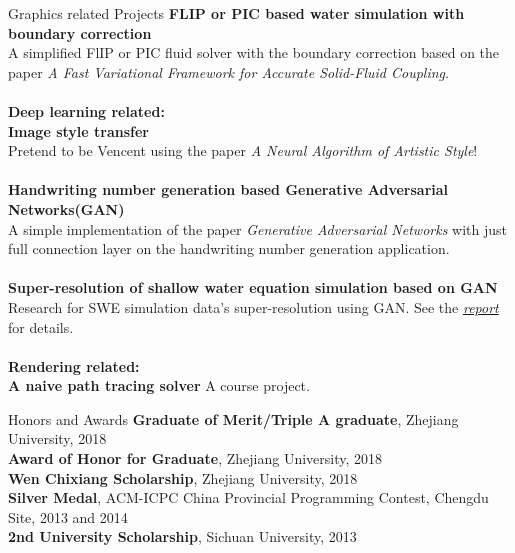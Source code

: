 \documentclass{resume} %
\makeatletter
\newcommand{\tabincell}[2]{\begin{tabular}{@{}#1@{}}#2\end{tabular}}
\makeatother
\begin{document}
\begin{rSection}{Graphics related Projects}
                {\bf FLIP or PIC based water simulation with boundary correction}\\A simplified FlIP or PIC fluid solver with the boundary correction based on the paper \emph{A Fast Variational Framework for Accurate Solid-Fluid Coupling}.\\\\
         \textbf{Deep learning related:}\\
                {\bf Image style transfer}\\Pretend to be Vencent using the paper \emph{A Neural Algorithm of Artistic Style}!\\\\
                {\bf Handwriting number generation based Generative Adversarial Networks(GAN)}\\ A simple implementation of the paper \emph{Generative Adversarial Networks} with just full connection layer on the handwriting number generation application.\\\\
                {\bf Super-resolution of shallow water equation simulation based on GAN}\\ Research for SWE simulation data's super-resolution using GAN. See the \emph{\href{SWE.pdf}{report}} for details.   \\\\
        \textbf{Rendering related:}\\
                {\bf A naive path tracing solver} A course project.
                
         
\end{rSection}

\begin{rSection}{Honors and Awards}
  \textbf{Graduate of Merit/Triple A graduate}, Zhejiang University, 2018\\
  \textbf{Award of Honor for Graduate}, Zhejiang University, 2018\\
  \textbf{Wen Chixiang Scholarship}, Zhejiang University, 2018\\
  \textbf{Silver Medal}, ACM-ICPC China Provincial Programming Contest, Chengdu Site, 2013 and 2014\\
  \textbf{2nd University Scholarship}, Sichuan University, 2013
\end{rSection}

{}
\end{document}

